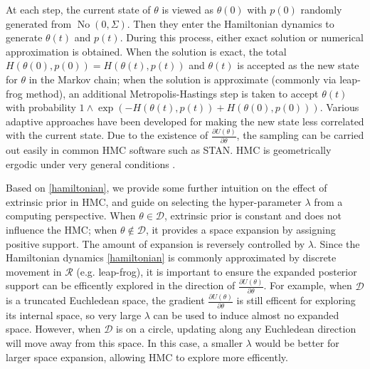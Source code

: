 \documentclass[10pt]{article}
\newcommand{\mc}[1]{\mathcal{#1}}
\DeclareMathOperator{\No}{No}
\begin{document}
At each step, the current state of $\theta$ is viewed as $\theta(0)$ with $p(0)$ randomly generated from $\No(0, \Sigma)$. Then they enter the Hamiltonian dynamics to generate $\theta(t)$ and $p(t)$. During this process, either exact solution or numerical approximation is obtained. When the solution is exact, the total 
$H(\theta(0),p(0)) = H(\theta(t),p(t))$ and $\theta(t)$ is accepted as the new state for $\theta$ in the Markov chain; when the solution is approximate (commonly via leap-frog method), an additional Metropolis-Hastings step is taken to accept $\theta(t)$ with probability $1\wedge \exp  \left( - H(\theta(t),p(t)) + H(\theta(0),p(0))\right)$. Various adaptive approaches \citep{neal2011mcmc,hoffman2014no} have been developed for making the new state less correlated with the current state. Due to the existence of $\frac{\partial U(\theta)}{\partial \theta}$, the sampling can be carried out easily in common HMC software such as STAN. HMC is geometrically ergodic under very general conditions \citep{livingstone2016geometric}.



Based on \eqref{hamiltonian}, we provide some further intuition on the effect of extrinsic prior in HMC, and guide on selecting the hyper-parameter $\lambda$ from a computing perspective. When $\theta \in \mc D$, extrinsic prior is constant and does not influence the HMC; when $\theta \not \in \mc D$, it provides a space expansion by assigning positive support. The amount of expansion is reversely controlled by $\lambda$. Since the Hamiltonian dynamics \eqref{hamiltonian} is commonly approximated by discrete movement in $\mc R$ (e.g. leap-frog), it is important to ensure the expanded posterior support can be efficently explored in the direction of $\frac{\partial U(\theta )}{\partial \theta}$. For example, when $\mc D$ is a truncated Euchledean space, the gradient $\frac{\partial U(\theta)}{\partial \theta}$ is still efficent for exploring its internal space, so very large $\lambda$ can be used to induce almost no expanded space. However, when $\mc D$ is on a circle, updating along any Euchledean direction will move away from this space. In this case, a smaller $\lambda$ would be better for larger space expansion, allowing HMC to explore more efficently.
\end{document}
